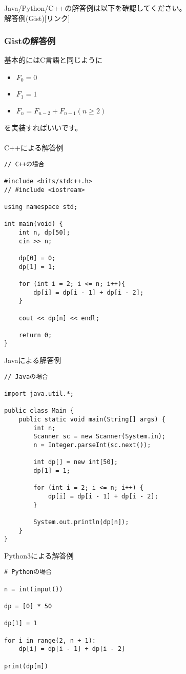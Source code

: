 \noindent
Java/Python/C++の解答例は以下を確認してください。\\
解答例(Gist)[リンク]

\clearpage

\subsubsection{Gistの解答例}
\noindent
基本的にはC言語と同じように

\begin{itemize}
    \item $F_0 = 0$
    \item $F_1 = 1$
    \item $F_{n} = F_{n-2} + F_{n-1} (n \geq 2)$
\end{itemize}

を実装すればいいです。
\\ \\
\noindent
C++による解答例
\begin{lstlisting}[style = customCpp]
// C++の場合

#include <bits/stdc++.h>
// #include <iostream>

using namespace std;

int main(void) {
    int n, dp[50];
    cin >> n;

    dp[0] = 0;
    dp[1] = 1;

    for (int i = 2; i <= n; i++){
        dp[i] = dp[i - 1] + dp[i - 2];
    }

    cout << dp[n] << endl;
    
    return 0;
}
\end{lstlisting}

\noindent
Javaによる解答例
\begin{lstlisting}[style = customJava]
// Javaの場合

import java.util.*;

public class Main {
    public static void main(String[] args) {
        int n;
        Scanner sc = new Scanner(System.in);
        n = Integer.parseInt(sc.next());

        int dp[] = new int[50];
        dp[1] = 1;

        for (int i = 2; i <= n; i++) {
            dp[i] = dp[i - 1] + dp[i - 2];
        }

        System.out.println(dp[n]);
    }
}
\end{lstlisting}

\clearpage

\noindent
Python3による解答例
\begin{lstlisting}[style = customPy]
# Pythonの場合

n = int(input())

dp = [0] * 50

dp[1] = 1

for i in range(2, n + 1):
    dp[i] = dp[i - 1] + dp[i - 2]
    
print(dp[n])
\end{lstlisting}

